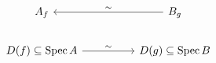 \[\begin{tikzcd}[column sep=huge]
A_f & B_g \arrow[l,"\sim"']\\
D(f)\subseteq\Spec A \arrow[r,"\sim"] & D(g)\subseteq\Spec B
\end{tikzcd}\]
